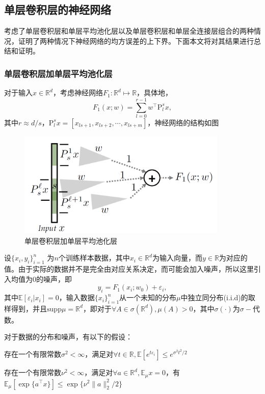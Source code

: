 \subsection{单层卷积层的神经网络}
\citet{du2018many}考虑了单层卷积层和单层平均池化层以及单层卷积层和单层全连接层组合的两种情况，\citet{du2018many}证明了两种情况下神经网络的均方误差的上下界。下面本文将对其结果进行总结和证明。
\subsubsection{单层卷积层加单层平均池化层}
对于输入$x\in \mathbb{R}^d$，考虑神经网络$F_1: \mathbb{R}^d \mapsto \mathbb{R}$，具体地，
\[
  F_1(x;w) = \sum_{l=0}^{r-1}w^{\top} \mathrm{P}_l^s x,
\]
其中$r\approx d/s$，$\mathrm{P}_l^s x=[x_{ls+1},x_{ls+2},\cdots,x_{ls+m}]$，神经网络的结构如图
\begin{figure}
\centering
\includegraphics[width=10cm]{./figures/convp.PNG}
\caption{单层卷积层加单层平均池化层}
\label{fig:convp}
\end{figure}
\par
设$\{x_i,y_i\}_{i=1}^n$ 为$n$个训练样本数据，其中$x_i \in \mathbb{R}^d$为输入向量，而$y\in \mathbb{R}$为对应的值。由于实际的数据并不是完全由对应关系决定，而可能会加入噪声，所以这里引入均值为0的噪声，即
\[
  y_i = F_1(x_i;w_0)+\varepsilon_i,
\]
其中$\mathbb{E}[\varepsilon_i|x_i] = 0$，输入数据$\{x_i\}_{i=1}^n$从一个未知的分布$\mu$中独立同分布(i.i.d)的取样得到，并且$\mathrm{supp}\mu = \mathbb{R}^d$，即对于$\forall A \in \sigma(\mathbb{R}^d), \mu(A) > 0$，其中$\sigma(\cdot)$为$\sigma-$代数。
\par
对于数据的分布和噪声，有以下的假设：
\begin{assumption}
存在一个有限常数$\sigma^2< \infty$，满足对$\forall t \in \mathbb{R}, \mathbb{E}[e^{t\varepsilon_i}] \leq e^{\sigma^2t^2/2}$
\end{assumption}
\begin{assumption}
存在一个有限常数$\nu^2< \infty$，满足对$\forall a \in \mathbb{R}^d, \mathbb{E}_\mu x = 0$，有$\mathbb{E}_\mu[\exp\{a^\top x\}]\leq \exp\{\nu^2\|a\|_2^2/2\}$
\end{assumption}
